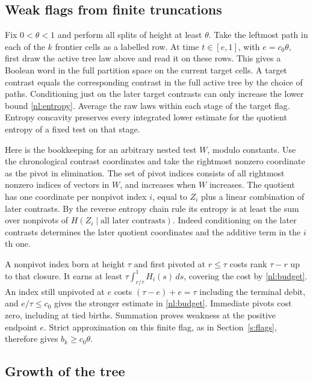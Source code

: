\documentclass[11pt]{article}
\numberwithin{equation}{section}
\begin{document}
\subsection{Weak flags from finite truncations}

Fix $0<\theta<1$ and perform all splits of height at least
$\theta$. Take the leftmost path in each of the $k$ frontier cells
as a labelled row. At time $t\in[e,1]$, with $e=c_0\theta$, first
draw the active tree law above and read it on these rows. This
gives a Boolean word in the full partition space on the current
target cells. A target contrast equals the corresponding contrast
in the full active tree by the choice of paths. Conditioning just
on the later target contrasts can only increase the lower bound
\eqref{nl:entropy}. Average the raw laws within each stage of the
target flag. Entropy concavity preserves every integrated lower
estimate for the quotient entropy of a fixed test on that stage.

Here is the bookkeeping for an arbitrary nested test $W$, modulo
constants. Use the chronological contrast coordinates and take the
rightmost nonzero coordinate as the pivot in elimination. The set
of pivot indices consists of all rightmost nonzero indices of
vectors in $W$, and increases when $W$ increases. The quotient has
one coordinate per nonpivot index $i$, equal to $Z_i$ plus a linear
combination of later contrasts. By the reverse entropy chain rule
its entropy is at least the sum over nonpivots of $H(Z_i\mid
\text{all later contrasts})$. Indeed conditioning on the later
contrasts determines the later quotient coordinates and the additive
term in the $i$th one.

A nonpivot index born at height $\tau$ and first pivoted at
$r\le\tau$ costs rank $\tau-r$ up to that closure. It earns at
least $\tau\int_{r/\tau}^1H_i(s)\,ds$, covering the cost by
\eqref{nl:budget}. An index still unpivoted at $e$ costs
$(\tau-e)+e=\tau$ including the terminal debit, and $e/\tau\le
c_0$ gives the stronger estimate in \eqref{nl:budget}. Immediate
pivots cost zero, including at tied births. Summation proves
weakness at the positive endpoint $e$. Strict approximation on this
finite flag, as in Section~\ref{s:flags}, therefore gives $b_k\ge c_0\theta$.

\subsection{Growth of the tree}
\end{document}
